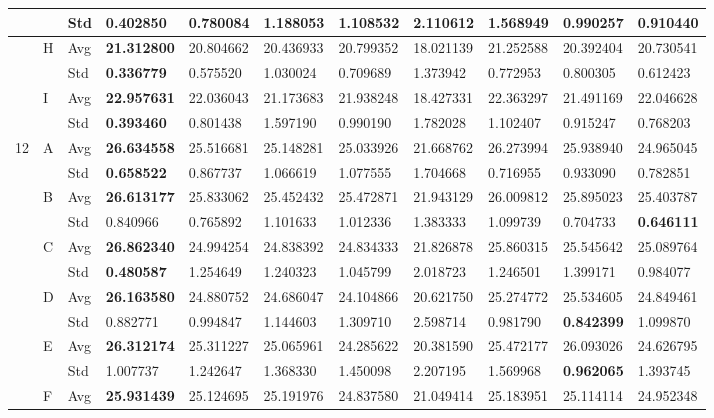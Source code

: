\documentclass{article} %
\begin{document}
\begin{tabular}{|p{0.4in}|p{0.3in}|p{0.3in}|p{0.5in}|p{0.5in}|p{0.5in}|p{0.5in}|p{0.5in}|p{0.5in}|p{0.5in}|p{0.5in}|}
 &  & Std & \textbf{0.402850 } & 0.780084  & 1.188053  & 1.108532  & 2.110612  & 1.568949  & 0.990257  & 0.910440  \\ \hline 
 & H & Avg & \textbf{21.312800 } & 20.804662  & 20.436933  & 20.799352  & 18.021139  & 21.252588  & 20.392404  & 20.730541  \\ \hline 
 &  & Std & \textbf{0.336779 } & 0.575520  & 1.030024  & 0.709689  & 1.373942  & 0.772953  & 0.800305  & 0.612423  \\ \hline 
 & I & Avg & \textbf{22.957631 } & 22.036043  & 21.173683  & 21.938248  & 18.427331  & 22.363297  & 21.491169  & 22.046628  \\ \hline 
 &  & Std & \textbf{0.393460 } & 0.801438  & 1.597190  & 0.990190  & 1.782028  & 1.102407  & 0.915247  & 0.768203  \\ \hline 
12 & A & Avg & \textbf{26.634558 } & 25.516681  & 25.148281  & 25.033926  & 21.668762  & 26.273994  & 25.938940  & 24.965045  \\ \hline 
 &  & Std & \textbf{0.658522 } & 0.867737  & 1.066619  & 1.077555  & 1.704668  & 0.716955  & 0.933090  & 0.782851  \\ \hline 
 & B & Avg & \textbf{26.613177 } & 25.833062  & 25.452432  & 25.472871  & 21.943129  & 26.009812  & 25.895023  & 25.403787  \\ \hline 
 &  & Std & 0.840966  & 0.765892  & 1.101633  & 1.012336  & 1.383333  & 1.099739  & 0.704733  & \textbf{0.646111 } \\ \hline 
 & C & Avg & \textbf{26.862340 } & 24.994254  & 24.838392  & 24.834333  & 21.826878  & 25.860315  & 25.545642  & 25.089764  \\ \hline 
 &  & Std & \textbf{0.480587 } & 1.254649  & 1.240323  & 1.045799  & 2.018723  & 1.246501  & 1.399171  & 0.984077  \\ \hline 
 & D & Avg & \textbf{26.163580 } & 24.880752  & 24.686047  & 24.104866  & 20.621750  & 25.274772  & 25.534605  & 24.849461  \\ \hline 
 &  & Std & 0.882771  & 0.994847  & 1.144603  & 1.309710  & 2.598714  & 0.981790  & \textbf{0.842399 } & 1.099870  \\ \hline 
 & E & Avg & \textbf{26.312174 } & 25.311227  & 25.065961  & 24.285622  & 20.381590  & 25.472177  & 26.093026  & 24.626795  \\ \hline 
 &  & Std & 1.007737  & 1.242647  & 1.368330  & 1.450098  & 2.207195  & 1.569968  & \textbf{0.962065 } & 1.393745  \\ \hline 
 & F & Avg & \textbf{25.931439 } & 25.124695  & 25.191976  & 24.837580  & 21.049414  & 25.183951  & 25.114114  & 24.952348  \\ \hline 

\end{tabular}
\end{document}

